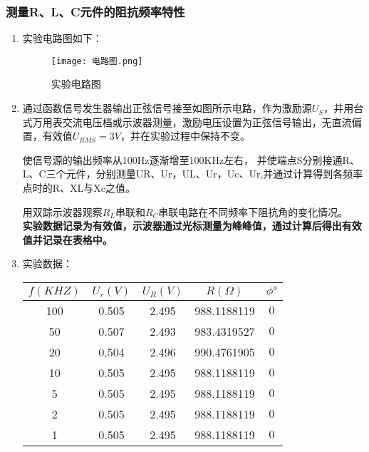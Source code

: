\documentclass[dvipsnames, svgnames,a4paper,11pt]{article}
\begin{document}
	\subsubsection{测量R、L、C元件的阻抗频率特性}
	\begin{enumerate}
		\item 实验电路图如下：
		\begin{figure}[{H}]
			\centering
			\texttt{[image: 电路图.png]}
			\caption{实验电路图}
			\label{}
		\end{figure}
		
		
		
		\item 通过函数信号发生器输出正弦信号接至如图所示电路，作为激励源$U_S$，并用台式万用表交流电压档或示波器测量，激励电压设置为正弦信号输出，无直流偏置，有效值$U_{RMS}=3V$，并在实验过程中保持不变。
		
		使信号源的输出频率从100Hz逐渐增至100KHz左右， 并使端点S分别接通R、L、C三个元件，分别测量UR、Ur，UL、Ur，Uc、Ur,并通过计算得到各频率点时的R、XL与Xc之值。

		用双踪示波器观察$R_L$串联和$R_C$串联电路在不同频率下阻抗角的变化情况。
		\\\textbf{实验数据记录为有效值，示波器通过光标测量为峰峰值，通过计算后得出有效值并记录在表格中。}
		\item 实验数据：
		\begin{table}[h]
			\centering
			\begin{tabular}{|c|c|c|c|c|}
			\hline
			$f(KHZ)$ & $U_r(V)$ & $U_R(V)$ & $R(\Omega)$ & $\phi °$ \\
			\hline
			
			100   & 0.505 & 2.495 & 988.1188119 & $0 $\\
			
			50  & 0.507 & 2.493 & 983.4319527 &$0 $\\
		
			20   & 0.504 & 2.496 & 990.4761905 & $0 $\\
			
			10  & 0.505 & 2.495 & 988.1188119 &$0 $ \\
			
			5   & 0.505 & 2.495 & 988.1188119 &$0 $ \\
			
			2   & 0.505 & 2.495 & 988.1188119 & $0 $\\
			
			1   & 0.505 & 2.495 & 988.1188119 & $0 $\\
			

\end{tabular}
\end{table}
\end{enumerate}
\end{document}
